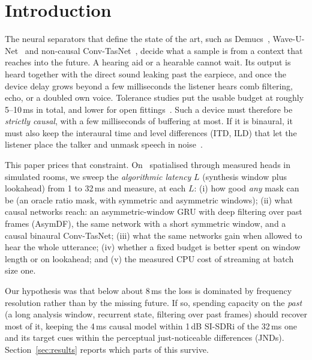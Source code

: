 \section{Introduction}
The neural separators that define the state of the art, such as
Demucs~\cite{defossez2020demucs}, Wave-U-Net~\cite{stoller2018waveunet}
and non-causal Conv-TasNet~\cite{luo2019convtasnet}, decide what a sample
is from a context that reaches into the future. A hearing aid or a hearable
cannot wait. Its output is heard together with the direct sound leaking
past the earpiece, and once the device delay grows beyond a few
milliseconds the listener hears comb filtering, echo, or a doubled own
voice. Tolerance studies put the usable budget at roughly 5--10\,ms in
total, and lower for open fittings~\cite{stone1999delay,stone2008opencanal}.
Such a device must therefore be \emph{strictly causal}, with a few
milliseconds of buffering at most. If it is binaural, it must also keep the
interaural time and level differences (ITD, ILD) that let the listener
place the talker and unmask speech in noise~\cite{doclo2015assisted}.

This paper prices that constraint. On \DataKind\ spatialised through
measured heads in simulated rooms, we sweep the \emph{algorithmic latency}
$L$ (synthesis window plus lookahead) from 1 to 32\,ms and measure, at each
$L$:
(i) how good \emph{any} mask can be (an oracle ratio mask, with symmetric
and asymmetric windows);
(ii) what causal networks reach: an asymmetric-window GRU with deep
filtering over past frames (AsymDF), the same network with a short
symmetric window, and a causal binaural Conv-TasNet;
(iii) what the same networks gain when allowed to hear the whole
utterance;
(iv) whether a fixed budget is better spent on window length or on
lookahead; and
(v) the measured CPU cost of streaming at batch size one.

Our hypothesis was that below about 8\,ms the loss is dominated by
frequency resolution rather than by the missing future. If so, spending
capacity on the \emph{past} (a long analysis window, recurrent state,
filtering over past frames) should recover most of it, keeping the 4\,ms
causal model within 1\,dB SI-SDRi of the 32\,ms one and its target cues
within the perceptual just-noticeable differences (JNDs). Section~\ref{sec:results}
reports which parts of this survive.
